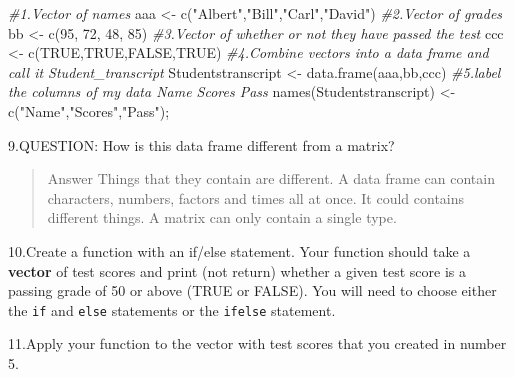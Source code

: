 \documentclass[
]{article}
\newenvironment{Shaded}{\begin{snugshade}}{\end{snugshade}}
\newcommand{\CommentTok}[1]{\textcolor[rgb]{0.56,0.35,0.01}{\textit{#1}}}
\newcommand{\DecValTok}[1]{\textcolor[rgb]{0.00,0.00,0.81}{#1}}
\newcommand{\FunctionTok}[1]{\textcolor[rgb]{0.00,0.00,0.00}{#1}}
\newcommand{\NormalTok}[1]{#1}
\newcommand{\OtherTok}[1]{\textcolor[rgb]{0.56,0.35,0.01}{#1}}
\newcommand{\StringTok}[1]{\textcolor[rgb]{0.31,0.60,0.02}{#1}}
\begin{document}
\begin{Shaded}
\begin{Highlighting}[]
\CommentTok{\#1.Vector of names}
\NormalTok{aaa }\OtherTok{\textless{}{-}} \FunctionTok{c}\NormalTok{(}\StringTok{"Albert"}\NormalTok{,}\StringTok{"Bill"}\NormalTok{,}\StringTok{"Carl"}\NormalTok{,}\StringTok{"David"}\NormalTok{)}
\CommentTok{\#2.Vector of grades}
\NormalTok{bb }\OtherTok{\textless{}{-}} \FunctionTok{c}\NormalTok{(}\DecValTok{95}\NormalTok{, }\DecValTok{72}\NormalTok{, }\DecValTok{48}\NormalTok{, }\DecValTok{85}\NormalTok{)}
\CommentTok{\#3.Vector of whether or not they have passed the test}
\NormalTok{ccc }\OtherTok{\textless{}{-}} \FunctionTok{c}\NormalTok{(}\StringTok{\textquotesingle{}TRUE\textquotesingle{}}\NormalTok{,}\StringTok{\textquotesingle{}TRUE\textquotesingle{}}\NormalTok{,}\StringTok{\textquotesingle{}FALSE\textquotesingle{}}\NormalTok{,}\StringTok{\textquotesingle{}TRUE\textquotesingle{}}\NormalTok{)}
\CommentTok{\#4.Combine vectors into a data frame and call it Student\_transcript}
\NormalTok{Studentstranscript }\OtherTok{\textless{}{-}} \FunctionTok{data.frame}\NormalTok{(aaa,bb,ccc) }
\CommentTok{\#5.label the columns of my data \textquotesingle{}Name\textquotesingle{} \textquotesingle{}Scores\textquotesingle{} \textquotesingle{}Pass\textquotesingle{}}
\FunctionTok{names}\NormalTok{(Studentstranscript) }\OtherTok{\textless{}{-}} \FunctionTok{c}\NormalTok{(}\StringTok{"Name"}\NormalTok{,}\StringTok{"Scores"}\NormalTok{,}\StringTok{"Pass"}\NormalTok{);}
\end{Highlighting}
\end{Shaded}

9.QUESTION: How is this data frame different from a matrix?

\begin{quote}
Answer Things that they contain are different. A data frame can contain
characters, numbers, factors and times all at once. It could contains
different things. A matrix can only contain a single type.
\end{quote}

10.Create a function with an if/else statement. Your function should
take a \textbf{vector} of test scores and print (not return) whether a
given test score is a passing grade of 50 or above (TRUE or FALSE). You
will need to choose either the \texttt{if} and \texttt{else} statements
or the \texttt{ifelse} statement.

11.Apply your function to the vector with test scores that you created
in number 5.
\end{document}
